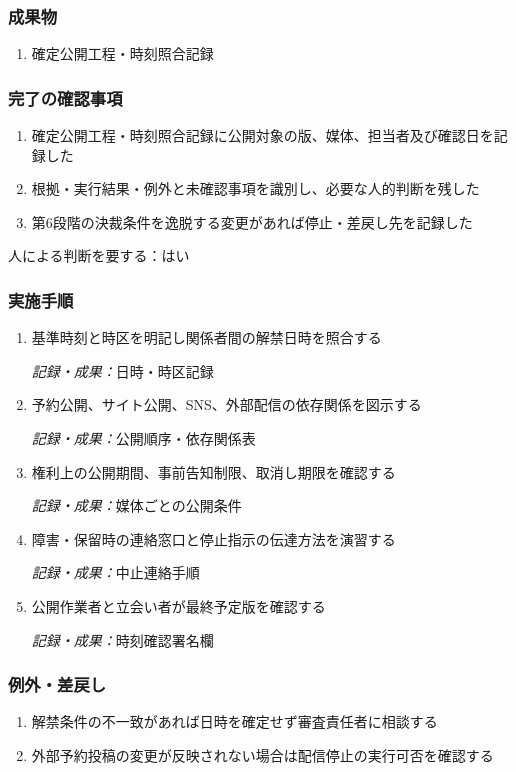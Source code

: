 \documentclass[a4paper,11pt]{article}
\begin{document}
\subsubsection*{成果物}
\begin{enumerate}[leftmargin=2em,itemsep=0.35em]
\item 確定公開工程・時刻照合記録
\end{enumerate}
\subsubsection*{完了の確認事項}
\begin{enumerate}[leftmargin=2em,itemsep=0.35em]
\item 確定公開工程・時刻照合記録に公開対象の版、媒体、担当者及び確認日を記録した
\item 根拠・実行結果・例外と未確認事項を識別し、必要な人的判断を残した
\item 第6段階の決裁条件を逸脱する変更があれば停止・差戻し先を記録した
\end{enumerate}
\par 人による判断を要する：はい\par\medskip
\subsubsection*{実施手順}
\begin{enumerate}[leftmargin=2em,itemsep=0.65em]
\item 基準時刻と時区を明記し関係者間の解禁日時を照合する\par\noindent\textit{記録・成果：}日時・時区記録\nobreak\smallskip
\item 予約公開、サイト公開、SNS、外部配信の依存関係を図示する\par\noindent\textit{記録・成果：}公開順序・依存関係表\nobreak\smallskip
\item 権利上の公開期間、事前告知制限、取消し期限を確認する\par\noindent\textit{記録・成果：}媒体ごとの公開条件\nobreak\smallskip
\item 障害・保留時の連絡窓口と停止指示の伝達方法を演習する\par\noindent\textit{記録・成果：}中止連絡手順\nobreak\smallskip
\item 公開作業者と立会い者が最終予定版を確認する\par\noindent\textit{記録・成果：}時刻確認署名欄\nobreak\smallskip
\end{enumerate}
\subsubsection*{例外・差戻し}
\begin{enumerate}[leftmargin=2em,itemsep=0.35em]
\item 解禁条件の不一致があれば日時を確定せず審査責任者に相談する
\item 外部予約投稿の変更が反映されない場合は配信停止の実行可否を確認する
\end{enumerate}
\end{document}
